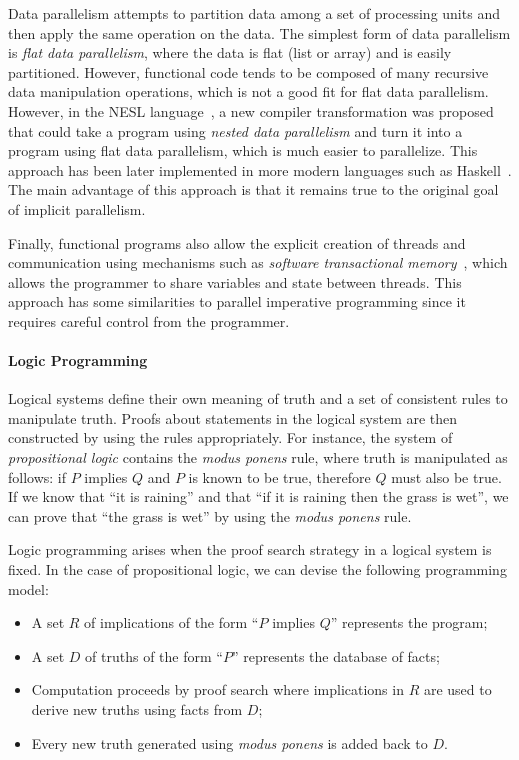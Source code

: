 Data parallelism attempts to partition data among a set of processing units and
then apply the same operation on the data. The simplest form of data parallelism
is \emph{flat data parallelism}, where the data is flat (list or array) and is
easily partitioned. However, functional code tends to be composed of many recursive
data manipulation operations, which is not a good fit for flat data parallelism.
However, in the NESL language~\cite{Blelloch:1996:PPA:227234.227246}, a new compiler
transformation was proposed that could take a program using \emph{nested data
parallelism} and turn it into a program using flat data parallelism, which is
much easier to parallelize. This approach has been later implemented in more
modern languages such as Haskell~\cite{Chakravarty07dataparallel}. The main
advantage of this approach is that it remains true to the original goal of
implicit parallelism.

Finally, functional programs also allow the explicit creation of threads and
communication using mechanisms such as \emph{software transactional
memory}~\cite{harris2005composable}, which allows the programmer to share
variables and state between threads. This approach has some similarities to
parallel imperative programming since it requires careful control from the
programmer.


\paragraph{Logic Programming}

Logical systems define their own meaning of truth and a set of consistent rules
to manipulate truth. Proofs about statements in the logical system are then
constructed by using the rules appropriately. For instance, the system of
\emph{propositional logic} contains the \emph{modus ponens} rule, where truth is
manipulated as follows: if $P$ implies $Q$ and $P$ is known to be true,
therefore $Q$ must also be true. If we know that ``it is raining'' and that ``if
it is raining then the grass is wet'', we can prove that ``the grass is wet'' by
using the \emph{modus ponens} rule.

Logic programming arises when the proof search strategy in a logical system is
fixed. In the case of propositional logic, we can devise the following
programming model:

\begin{itemize}
   \item A set $R$ of implications of the form ``$P$ implies $Q$'' represents the
      program;
   \item A set $D$ of truths of the form ``$P$'' represents the database of
      facts;
   \item Computation proceeds by proof search where implications in $R$ are used
      to derive new truths using facts from $D$;
   \item Every new truth generated using \emph{modus ponens} is added back to
      $D$.
\end{itemize}

